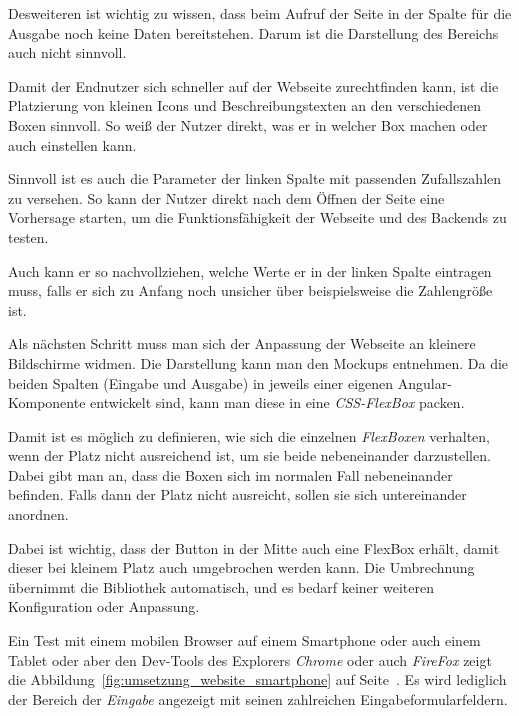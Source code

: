 Desweiteren ist wichtig zu wissen, dass beim Aufruf der Seite in der Spalte für die Ausgabe noch keine Daten
bereitstehen. Darum ist die Darstellung des Bereichs auch nicht sinnvoll.

Damit der Endnutzer sich schneller auf der Webseite zurechtfinden kann, ist die Platzierung von kleinen Icons und
Beschreibungstexten an den verschiedenen Boxen sinnvoll. So weiß der Nutzer direkt, was er in welcher Box machen oder
auch einstellen kann.

Sinnvoll ist es auch die Parameter der linken Spalte mit passenden Zufallszahlen zu versehen. So kann der Nutzer direkt
nach dem Öffnen der Seite eine Vorhersage starten, um die Funktionsfähigkeit der Webseite und des Backends zu testen.

Auch kann er so nachvollziehen, welche Werte er in der linken Spalte eintragen muss, falls er sich zu Anfang noch
unsicher über beispielsweise die Zahlengröße ist.

Als nächsten Schritt muss man sich der Anpassung der Webseite an kleinere Bildschirme widmen. Die Darstellung kann man
den Mockups entnehmen. Da die beiden Spalten (Eingabe und Ausgabe) in jeweils einer eigenen Angular-Komponente
entwickelt sind, kann man diese in eine \textit{CSS-FlexBox} packen.

Damit ist es möglich zu definieren, wie sich die einzelnen \textit{FlexBoxen} verhalten, wenn der Platz nicht
ausreichend ist, um sie beide nebeneinander darzustellen. Dabei gibt man an, dass die Boxen sich im normalen Fall
nebeneinander befinden. Falls dann der Platz nicht ausreicht, sollen sie sich untereinander anordnen.

Dabei ist wichtig, dass der Button in der Mitte auch eine FlexBox erhält, damit dieser bei kleinem Platz auch
umgebrochen werden kann. Die Umbrechnung übernimmt die Bibliothek automatisch, und es bedarf keiner weiteren
Konfiguration oder Anpassung.

Ein Test mit einem mobilen Browser auf einem Smartphone oder auch einem Tablet oder aber den Dev-Tools des Explorers
\textit{Chrome} oder auch \textit{FireFox} zeigt die Abbildung~\ref{fig:umsetzung_website_smartphone} auf
Seite~\pageref{fig:umsetzung_website_smartphone}. Es wird lediglich der Bereich der \textit{Eingabe} angezeigt mit
seinen zahlreichen Eingabeformularfeldern.

